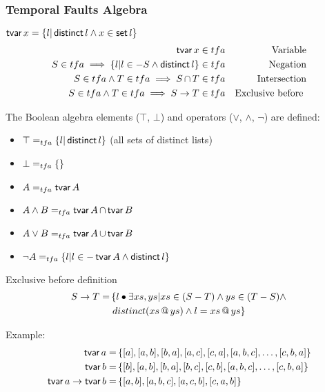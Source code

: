 \begin{frame}
\frametitle{Temporal Faults Algebra}

$\operatorname{\mathsf{tvar}} x = \{l | \operatorname{\mathsf{distinct}} l \land x \in \operatorname{\mathsf{set}} l\}$
%
\begin{subequations}
\begin{align}
%
\tvar x &\in \tfa & \text{Variable}\\
%
S \in \tfa \implies \{ l | l \in -S \land \distinct l\} &\in \tfa & \text{Negation}\\
%
S \in \tfa \land T \in \tfa \implies 
S \inter T &\in \tfa & \text{Intersection} \\
%
S \in \tfa \land T \in \tfa \implies 
S \rightarrow T & \in \tfa & \text{Exclusive before }
%
\end{align} %
%
\end{subequations}%

The Boolean algebra elements ($\top$, $\bot$) and operators ($\lor$, $\land$, $\lnot$) are defined:
\begin{itemize}
  \item $\top =_{tfa} \{l | \operatorname{\mathsf{distinct}} l\}$ (all sets of distinct lists)
  \item $\bot =_{tfa} \{\}$
  \item $A =_{tfa} \operatorname{\mathsf{tvar}} A $
  \item $A \land B =_{tfa} \operatorname{\mathsf{tvar}} A \operatorname{\cap} \operatorname{\mathsf{tvar}} B$
  \item $A \lor B =_{tfa} \operatorname{\mathsf{tvar}} A \operatorname{\cup} \operatorname{\mathsf{tvar}} B$
  \item $\lnot A =_{tfa} \{l | l \in - \operatorname{\mathsf{tvar}} A \land \operatorname{\mathsf{distinct}} l\}$
\end{itemize}
\end{frame}

\begin{frame}{Exclusive before definition}
\begin{align*}
S \rightarrow T = &\left\{ l \bullet \exists xs, ys | xs \in (S - T) \land ys \in (T - S) \land \right.
%
\\& \left. distinct (xs \concat ys) \land l = xs \concat ys \right\}
\end{align*}

Example:
\begin{align*}
\operatorname{\mathsf{tvar}} a =& \left\{[a],[a,b],[b,a],[a,c],[c,a],[a,b,c],\ldots,[c,b,a]\right\} \\
\operatorname{\mathsf{tvar}} b =& \left\{[b],[a,b],[b,a],[b,c],[c,b],[a,b,c],\ldots,[c,b,a]\right\} \\
\operatorname{\mathsf{tvar}} a \rightarrow \operatorname{\mathsf{tvar}} b =& \left\{[a,b],[a,b,c],[a,c,b],[c,a,b]\right\}
\end{align*}

\end{frame}

